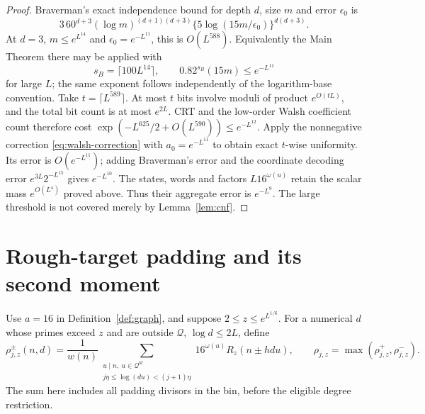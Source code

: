 \documentclass[11pt]{article}
\theoremstyle{definition}
\theoremstyle{remark}
\numberwithin{equation}{section}
\newcommand{\Qset}{\mathcal Q}
\newcommand{\sfw}{\mathrm{sf}}
\begin{document}
\begin{proof}
Braverman's exact independence bound \cite[Corollary~2, p.~1]{Braverman} for depth $d$, size $m$ and error
$\epsilon_0$ is
\begin{equation}\label{eq:braverman}
 3\,60^{d+3}(\log m)^{(d+1)(d+3)}
       \{5\log(15m/\epsilon_0)\}^{d(d+3)}.
\end{equation}
At $d=3$, $m\le e^{L^{14}}$ and $\epsilon_0=e^{-L^{11}}$, this is $O(L^{588})$.
Equivalently the Main Theorem there may be applied with
\begin{equation}\label{eq:braverman-ceiling}
 s_B=\lceil100L^{14}\rceil,\qquad 0.82^{s_B}(15m)\le e^{-L^{11}}
\end{equation}
for large $L$; the same exponent follows independently of the logarithm-base convention.
Take $t=\lceil L^{589}\rceil$. At most $t$ bits involve moduli of product $e^{O(tL)}$, and the total bit count is
at most $e^{2L}$. CRT and the low-order Walsh coefficient count therefore cost
$\exp(-L^{625}/2+O(L^{590}))\le e^{-L^{12}}$.
Apply the nonnegative correction \eqref{eq:walsh-correction} with $a_0=e^{-L^{11}}$ to obtain exact $t$-wise
uniformity. Its error is $O(e^{-L^{11}})$; adding Braverman's error and the coordinate decoding error
$e^{3L}2^{-L^{15}}$ gives $e^{-L^{10}}$.
The states, words and factors $L16^{\omega(u)}$ retain the scalar mass $e^{O(L^4)}$ proved above.
Thus their aggregate error is $e^{-L^9}$. The large threshold is not covered merely by Lemma~\ref{lem:cnf}.
\end{proof}

\section{Rough-target padding and its second moment}\label{sec:collision}
Use $a=16$ in Definition~\ref{def:graph}, and suppose $2\le z\le e^{L^{1/6}}$.
For a numerical $d$ whose primes exceed $z$ and are outside $\Qset$, $\log d\le2L$, define
\begin{equation}\label{eq:masked-rho}
 \rho_{j,z}^{\pm}(n,d)=\frac1{w(n)}
 \sum_{\substack{u\mid n,\ u\in\Qset^{\sfw}\\j\eta\le\log(du)<(j+1)\eta}}
 16^{\omega(u)}R_z(n\pm hdu),\qquad
 \rho_{j,z}=\max(\rho_{j,z}^+,\rho_{j,z}^-).
\end{equation}
The sum here includes all padding divisors in the bin, before the eligible degree restriction.
\end{document}
